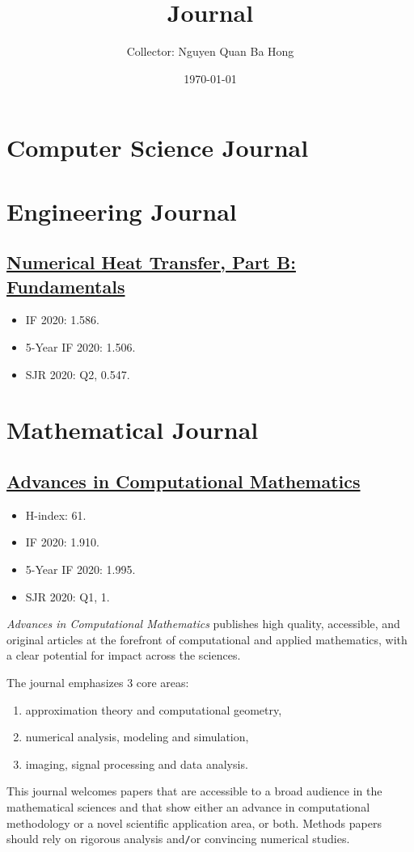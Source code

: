\documentclass{article}
\title{Journal}
\author{Collector: Nguyen Quan Ba Hong}
\date{\today}
\numberwithin{equation}{section}
\begin{document}
\maketitle
\tableofcontents


\section{Computer Science Journal}

\section{Engineering Journal}

\subsection{\href{https://www.tandfonline.com/journals/unhb20}{Numerical Heat Transfer, Part B: Fundamentals}}
\begin{itemize}
	\item IF 2020: 1.586.
	\item 5-Year IF 2020: 1.506.
	\item SJR 2020: Q2, 0.547.
\end{itemize}

\section{Mathematical Journal}

\subsection{\href{https://www.springer.com/journal/10444}{Advances in Computational Mathematics}}
\begin{itemize}
	\item H-index: 61.
	\item IF 2020: 1.910.
	\item 5-Year IF 2020: 1.995.
	\item SJR 2020: Q1, 1.
\end{itemize}
\textit{Advances in Computational Mathematics} publishes high quality, accessible, and original articles at the forefront of computational and applied mathematics, with a clear potential for impact across the sciences.

The journal emphasizes 3 core areas:
\begin{enumerate}
	\item approximation theory and computational geometry,
	\item numerical analysis, modeling and simulation,
	\item imaging, signal processing and data analysis.
\end{enumerate}
This journal welcomes papers that are accessible to a broad audience in the mathematical sciences and that show either an advance in computational methodology or a novel scientific application area, or both. Methods papers should rely on rigorous analysis and\texttt{/}or convincing numerical studies.
\end{document}
